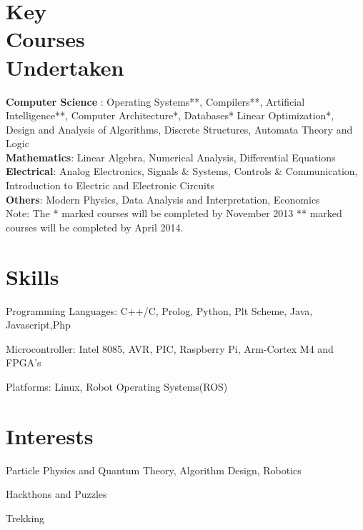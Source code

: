 \documentclass[margin,11pt]{resume}
\begin{document}
\begin{resume}
\section{\mysidestyle Key\\ Courses\\ Undertaken}

\textbf{Computer Science} :
Operating Systems**, Compilers**, Artificial Intelligence**, 
Computer Architecture*, Databases*
Linear Optimization*, 
Design and Analysis of Algorithms, 
Discrete Structures, 
Automata Theory and Logic\\       
\textbf{Mathematics}: Linear Algebra, Numerical Analysis, Differential Equations\\
\textbf{Electrical}: Analog Electronics, Signals \& Systems, Controls \& Communication, Introduction to Electric and Electronic Circuits\\
\textbf{Others}: Modern Physics, Data Analysis and Interpretation, Economics
\\Note: The * marked courses will be completed by November 2013 ** marked courses will be completed by April 2014.

\vspace{-1mm}
\section{\mysidestyle Skills}
\begin{list2}
\item Programming Languages: C++/C, Prolog, Python, Plt Scheme, Java, Javascript,Php
\item Microcontroller: Intel 8085, AVR, PIC, Raspberry Pi, Arm-Cortex M4 and  FPGA's
\item Platforms: Linux, Robot Operating Systems(ROS)
\end{list2}	
\section{\mysidestyle Interests} 
\begin{list2}
\item Particle Physics and Quantum Theory, Algorithm Design, Robotics
\item Hackthons and Puzzles
\item Trekking 				
\end{list2}

\end{resume}
\end{document}
